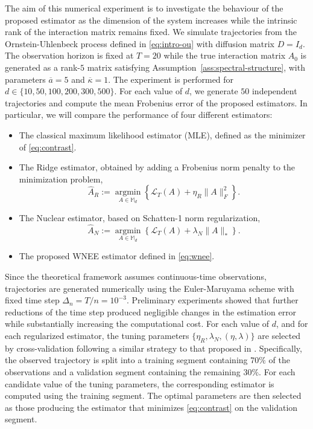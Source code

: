 \documentclass[11pt]{article}
\begin{document}
The aim of this numerical experiment is to investigate the behaviour of the proposed estimator as the dimension of the system increases while the intrinsic rank of the interaction matrix remains fixed. We simulate trajectories from the Ornstein-Uhlenbeck process defined in \eqref{eq:intro-ou} with diffusion matrix $D=I_d$. The observation horizon is fixed at $T=20$ while  the true interaction matrix $A_0$ is generated as a rank-$5$ matrix satisfying Assumption~\ref{ass:spectral-structure}, with parameters $\overline{a}=5$ and $\overline{\kappa}=1$. The experiment is performed for $
d\in\{10,50,100,200,300,500\}$.
For each value of $d$, we generate $50$ independent trajectories and compute  the mean Frobenius error of the proposed estimators. In particular, we will compare the performance of four different estimators:
\begin{itemize}
    \item [1)] The classical maximum likelihood estimator (MLE), defined as the minimizer of \eqref{eq:contrast}.
    \item [2)]  The Ridge estimator, obtained by adding a Frobenius norm penalty to the minimization problem,
    \begin{equation*}
    \widehat{A}_{R}:= \underset{A\in\mathbb M_d}{\operatorname{argmin}} \left\{\mathcal L_T(A) + \eta_R \|A\|_F^2\right\}.
\end{equation*}
    \item[3)] The Nuclear estimator, based on Schatten-1 norm regularization,
    \begin{equation*}
    \widehat{A}_N := \underset{A\in\mathbb M_d}{\operatorname{argmin}} \left\{\mathcal L_T(A) + \lambda_N \|A\|_*\right\}.
\end{equation*}
    \item [4)] The proposed WNEE estimator defined in \eqref{eq:wnee}.
\end{itemize}
Since the theoretical framework assumes continuous-time observations, trajectories are generated numerically using the Euler-Maruyama scheme with fixed time step $\Delta_n=T/n = 10^{-3}$. Preliminary experiments showed that further reductions of the time step produced negligible changes in the estimation error while substantially increasing the computational cost. For each value of $d$,  and for each regularized estimator, the tuning parameters $\{ \eta_R, \lambda_N, (\eta,\lambda)\}$ are selected by cross-validation following a similar strategy to that proposed in \cite{CiolekMarushkevychPodolskij2025}.  Specifically, the observed trajectory is split into a training segment containing $70\%$ of the observations and a validation segment containing the remaining $30\%$. For each candidate value of the tuning parameters, the corresponding estimator is computed using the training segment. The optimal  parameters are then selected as those producing the estimator that minimizes  \eqref{eq:contrast} on the validation segment.
\end{document}
